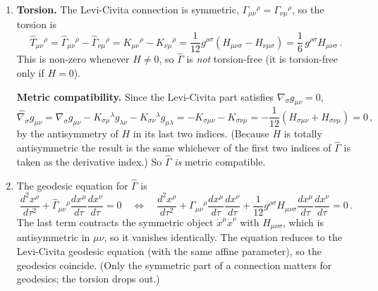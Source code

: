 \documentclass[12pt]{article}
\newcommand{\be}{\begin{equation}}
\newcommand{\ee}{\end{equation}}
\begin{document}
\begin{enumerate}[label=\alph*)]
\item \textbf{Torsion.} The Levi-Civita connection is symmetric, $\Gamma_{\mu\nu}{}^\rho=\Gamma_{\nu\mu}{}^\rho$, so the torsion is
\be
\hat T_{\mu\nu}{}^\rho = \hat\Gamma_{\mu\nu}{}^\rho - \hat\Gamma_{\nu\mu}{}^\rho
= K_{\mu\nu}{}^\rho - K_{\nu\mu}{}^\rho = \frac{1}{12}g^{\rho\sigma}\left(H_{\mu\nu\sigma}-H_{\nu\mu\sigma}\right)
= \frac{1}{6}\,g^{\rho\sigma}H_{\mu\nu\sigma}\,.
\ee
This is non-zero whenever $H\neq0$, so $\hat\Gamma$ is \emph{not} torsion-free (it is torsion-free only if $H=0$).

\textbf{Metric compatibility.} Since the Levi-Civita part satisfies $\nabla_\sigma g_{\mu\nu}=0$,
\be
\hat\nabla_\sigma g_{\mu\nu} = \nabla_\sigma g_{\mu\nu} - K_{\sigma\mu}{}^\lambda g_{\lambda\nu} - K_{\sigma\nu}{}^\lambda g_{\mu\lambda}
= -K_{\sigma\mu\nu} - K_{\sigma\nu\mu} = -\frac{1}{12}\left(H_{\sigma\mu\nu}+H_{\sigma\nu\mu}\right) = 0\,,
\ee
by the antisymmetry of $H$ in its last two indices. (Because $H$ is totally antisymmetric the result is the same whichever of the first two indices of $\hat\Gamma$ is taken as the derivative index.) So $\hat\Gamma$ \emph{is} metric compatible.

\item The geodesic equation for $\hat\Gamma$ is
\be
\frac{d^2x^\rho}{d\tau^2} + \hat\Gamma_{\mu\nu}{}^\rho\frac{dx^\mu}{d\tau}\frac{dx^\nu}{d\tau}=0
\quad\Longleftrightarrow\quad
\frac{d^2x^\rho}{d\tau^2} + \Gamma_{\mu\nu}{}^\rho\frac{dx^\mu}{d\tau}\frac{dx^\nu}{d\tau}
+ \frac{1}{12}g^{\rho\sigma}H_{\mu\nu\sigma}\frac{dx^\mu}{d\tau}\frac{dx^\nu}{d\tau}=0\,.
\ee
The last term contracts the symmetric object $\dot x^\mu\dot x^\nu$ with $H_{\mu\nu\sigma}$, which is antisymmetric in $\mu\nu$, so it vanishes identically. The equation reduces to the Levi-Civita geodesic equation (with the same affine parameter), so the geodesics coincide. (Only the symmetric part of a connection matters for geodesics; the torsion drops out.)
\end{enumerate}
\end{document}

